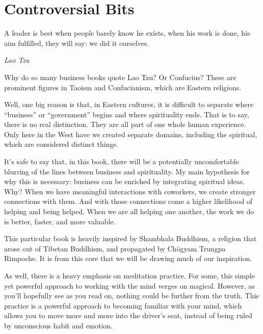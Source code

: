 \chapter{Controversial Bits}
\epigraph{A leader is best when people barely know he exists, when his work is done, his aim fulfilled, they will say: we did it ourselves.}{\textit{Lao Tzu}}

Why do so many business books quote Lao Tzu? Or Confucius? These are prominent figures in Taoism
and Confucianism, which are Eastern religions.

Well, one big reason is that, in Eastern cultures, it is difficult to separate where ``business'' or ``government''
begins and where spirituality ends. That is to say, there is no real distinction. They are all part of one whole 
human experience. Only here in the West have we created separate domains, including the spiritual, which 
are considered distinct things.

It's safe to say that, in this book, there will be a potentially uncomfortable blurring of the lines between business
and spirituality. My main hypothesis for why this is necessary: business can be enriched by integrating spiritual
ideas. Why? When we have meaningful interactions with coworkers, we create stronger connections with them.
And with those connections come a higher likelihood of helping and being helped. When we are all helping
one another, the work we do is better, faster, and more valuable.

This particular book is heavily inspired by Shambhala Buddhism, a religion that arose out of Tibetan Buddhism,
and propagated by Ch{\"o}gyam Trungpa Rimpoche. It is from this core that we will be drawing
much of our inspiration.

As well, there is a heavy emphasis on meditation practice. For some, this simple yet powerful approach to 
working with the mind verges on magical. However, as you'll hopefully see as you read on, nothing
could be further from the truth. This practice is a powerful approach to becoming familiar with your 
mind, which allows you to move more and more into the driver's seat, instead of being ruled by unconscious
habit and emotion.